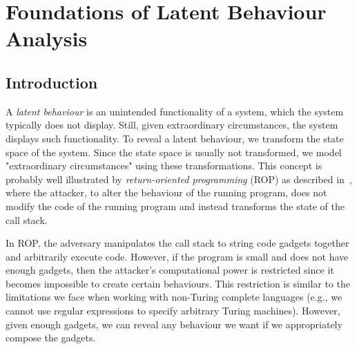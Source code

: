 

\chapter{Foundations of Latent Behaviour Analysis} %
\label{ch:LatentBehaviours} %

\section{Introduction}
\label{sec:Latent:Introduction}
A \emph{latent behaviour} is an unintended functionality of a system, which the system typically does not display. Still, given extraordinary circumstances, the system displays such functionality. To reveal a latent behaviour, we transform the state space of the system. Since the state space is usually not transformed, we model "extraordinary circumstances" using these transformations. This concept is probably well illustrated by \emph{return-oriented programming} (ROP) as described in~\cite{ROP}, where the attacker, to alter the behaviour of the running program, does not modify the code of the running program and instead transforms the state of the call stack.

In ROP, the adversary manipulates the call stack to string code gadgets together and arbitrarily execute code. However, if the program is small and does not have enough gadgets, then the attacker's computational power is restricted since it becomes impossible to create certain behaviours. This restriction is similar to the limitations we face when working with non-Turing complete languages (e.g., we cannot use regular expressions to specify arbitrary Turing machines). However, given enough gadgets, we can reveal any behaviour we want if we appropriately compose the gadgets.

